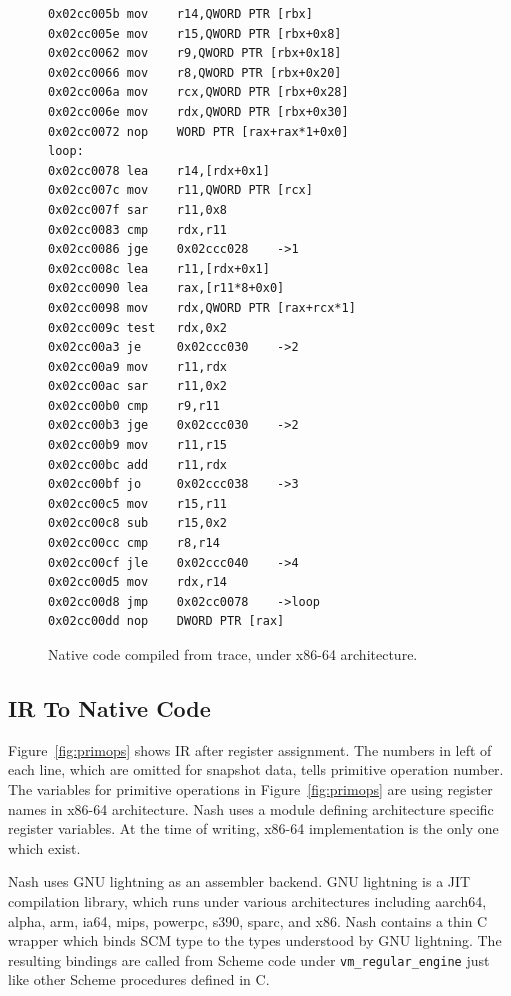 \documentclass[preprint, 10pt]{sigplanconf}
\begin{document}
\begin{figure}
  \centering
  \small
\begin{verbatim}
0x02cc005b mov    r14,QWORD PTR [rbx]
0x02cc005e mov    r15,QWORD PTR [rbx+0x8]
0x02cc0062 mov    r9,QWORD PTR [rbx+0x18]
0x02cc0066 mov    r8,QWORD PTR [rbx+0x20]
0x02cc006a mov    rcx,QWORD PTR [rbx+0x28]
0x02cc006e mov    rdx,QWORD PTR [rbx+0x30]
0x02cc0072 nop    WORD PTR [rax+rax*1+0x0]
loop:
0x02cc0078 lea    r14,[rdx+0x1]
0x02cc007c mov    r11,QWORD PTR [rcx]
0x02cc007f sar    r11,0x8
0x02cc0083 cmp    rdx,r11
0x02cc0086 jge    0x02ccc028    ->1
0x02cc008c lea    r11,[rdx+0x1]
0x02cc0090 lea    rax,[r11*8+0x0]
0x02cc0098 mov    rdx,QWORD PTR [rax+rcx*1]
0x02cc009c test   rdx,0x2
0x02cc00a3 je     0x02ccc030    ->2
0x02cc00a9 mov    r11,rdx
0x02cc00ac sar    r11,0x2
0x02cc00b0 cmp    r9,r11
0x02cc00b3 jge    0x02ccc030    ->2
0x02cc00b9 mov    r11,r15
0x02cc00bc add    r11,rdx
0x02cc00bf jo     0x02ccc038    ->3
0x02cc00c5 mov    r15,r11
0x02cc00c8 sub    r15,0x2
0x02cc00cc cmp    r8,r14
0x02cc00cf jle    0x02ccc040    ->4
0x02cc00d5 mov    rdx,r14
0x02cc00d8 jmp    0x02cc0078    ->loop
0x02cc00dd nop    DWORD PTR [rax]
\end{verbatim}
\caption{Native code compiled from trace, under x86-64 architecture.}
\label{fig:ncode}
\end{figure}

\subsection{IR To Native Code}

Figure~\hyperref[fig:primops]{\ref{fig:primops}} shows IR after register
assignment. The numbers in left of each line, which are omitted for snapshot
data, tells primitive operation number. The variables for primitive operations
in Figure~\hyperref[fig:primops]{\ref{fig:primops}} are using register names
in x86-64 architecture. Nash uses a module defining architecture specific
register variables. At the time of writing, x86-64 implementation is the only
one which exist.

Nash uses GNU lightning as an assembler backend. GNU lightning is a JIT
compilation library, which runs under various architectures including aarch64,
alpha, arm, ia64, mips, powerpc, s390, sparc, and x86. Nash contains a thin C
wrapper which binds SCM type to the types understood by GNU lightning. The
resulting bindings are called from Scheme code under
\texttt{vm\_regular\_engine} just like other Scheme procedures defined in C.
\end{document}
